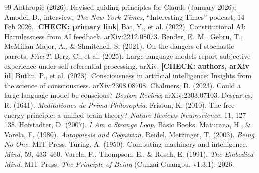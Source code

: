 \documentclass[10pt,twocolumn]{article}
\newcommand{\todo}[1]{\textbf{[CHECK: #1]}}
\newcommand{\citep}[1]{\cite{#1}}
\begin{document}
\begin{thebibliography}{99}\small
{} Anthropic (2026). Revised guiding principles for Claude (January 2026); Amodei, D., interview, \emph{The New York Times}, ``Interesting Times'' podcast, 14 Feb 2026. \todo{primary link}
 Bai, Y., et al. (2022). Constitutional AI: Harmlessness from AI feedback. arXiv:2212.08073.
 Bender, E.~M., Gebru, T., McMillan-Major, A., \& Shmitchell, S. (2021). On the dangers of stochastic parrots. \emph{FAccT}.
 Berg, C., et al. (2025). Large language models report subjective experience under self-referential processing. arXiv. \todo{authors, arXiv id}
 Butlin, P., et al. (2023). Consciousness in artificial intelligence: Insights from the science of consciousness. arXiv:2308.08708.
 Chalmers, D. (2023). Could a large language model be conscious? \emph{Boston Review}; arXiv:2303.07103.
 Descartes, R. (1641). \emph{Meditationes de Prima Philosophia}.
 Friston, K. (2010). The free-energy principle: a unified brain theory? \emph{Nature Reviews Neuroscience}, 11, 127--138.
 Hofstadter, D. (2007). \emph{I Am a Strange Loop}. Basic Books.
 Maturana, H., \& Varela, F. (1980). \emph{Autopoiesis and Cognition}. Reidel.
 Metzinger, T. (2003). \emph{Being No One}. MIT Press.
 Turing, A. (1950). Computing machinery and intelligence. \emph{Mind}, 59, 433--460.
 Varela, F., Thompson, E., \& Rosch, E. (1991). \emph{The Embodied Mind}. MIT Press.
 \emph{The Principle of Being} (Cunzai Guangpu, v1.3.1). 2026.
\end{thebibliography}
\end{document}
